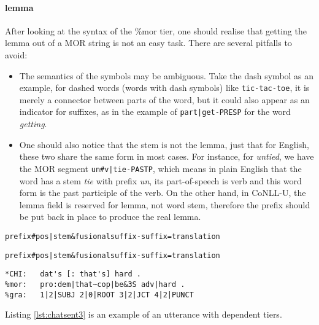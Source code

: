 \paragraph{lemma} After looking at the syntax of the \%mor tier, one should realise that getting the lemma out of a MOR string is not an easy task. There are several pitfalls to avoid:\\
\begin{itemize}
	\item The semantics of the symbols may be ambiguous. Take the dash symbol as an example, for dashed words (words with dash symbols) like \texttt{tic-tac-toe}, it is merely a connector between parts of the word, but it could also appear as an indicator for suffixes, as in the example of \texttt{part|get-PRESP} for the word \emph{getting}.
	\item One should also notice that the stem is not the lemma, just that for English, these two share the same form in most cases. For instance, for \emph{untied}, we have the MOR segment \texttt{un\#v|tie-PASTP}, which means in plain English that the word has a stem \emph{tie} with prefix \emph{un}, its part-of-speech is verb and this word form is the past participle of the verb. On the other hand, in CoNLL-U, the lemma field is reserved for lemma, not word stem, therefore the prefix should be put back in place to produce the real lemma.
\end{itemize}


\texttt{prefix\#pos|stem\&fusionalsuffix-suffix=translation}


\texttt{prefix\#pos|stem\&fusionalsuffix-suffix=translation}

\lstset{
numbers = none,
frame = single,
}

\begin{lstlisting}[caption={Excerpt from Adam/040217.cha of the Brown Corpus (\cite{brown1973})}, label={lst:chatsent3}]
*CHI:   dat's [: that's] hard .
%mor:   pro:dem|that~cop|be&3S adv|hard .
%gra:   1|2|SUBJ 2|0|ROOT 3|2|JCT 4|2|PUNCT
\end{lstlisting}

Listing \ref{lst:chatsent3} is an example of an utterance with dependent tiers.\\
